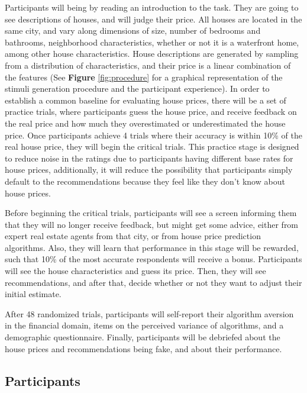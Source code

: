 \documentclass[
  man ,floatsintext]{apa7}
\begin{document}
Participants will being by reading an introduction to the task. They are going to see descriptions of houses, and will judge their price. All houses are located in the same city, and vary along dimensions of size, number of bedrooms and bathrooms, neighborhood characteristics, whether or not it is a waterfront home, among other house characteristics. House descriptions are generated by sampling from a distribution of characteristics, and their price is a linear combination of the features (See \textbf{Figure} \ref{fig:procedure} for a graphical representation of the stimuli generation procedure and the participant experience). In order to establish a common baseline for evaluating house prices, there will be a set of practice trials, where participants guess the house price, and receive feedback on the real price and how much they overestimated or underestimated the house price. Once participants achieve 4 trials where their accuracy is within 10\% of the real house price, they will begin the critical trials. This practice stage is designed to reduce noise in the ratings due to participants having different base rates for house prices, additionally, it will reduce the possibility that participants simply default to the recommendations because they feel like they don't know about house prices.

Before beginning the critical trials, participants will see a screen informing them that they will no longer receive feedback, but might get some advice, either from expert real estate agents from that city, or from house price prediction algorithms. Also, they will learn that performance in this stage will be rewarded, such that 10\% of the most accurate respondents will receive a bonus. Participants will see the house characteristics and guess its price. Then, they will see recommendations, and after that, decide whether or not they want to adjust their initial estimate.

After 48 randomized trials, participants will self-report their algorithm aversion in the financial domain, items on the perceived variance of algorithms, and a demographic questionnaire. Finally, participants will be debriefed about the house prices and recommendations being fake, and about their performance.

\hypertarget{participants}{%
\subsection{Participants}\label{participants}}
\end{document}
